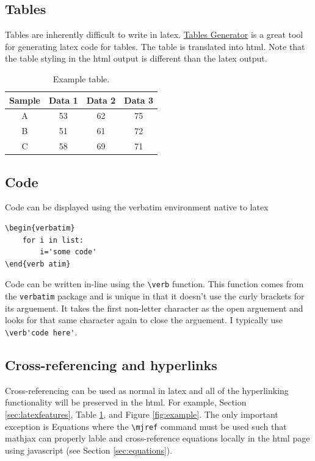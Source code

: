 \documentclass{article}
\begin{document}
\subsection{Tables}
Tables are inherently difficult to write in latex. \href{https://www.tablesgenerator.com/}{Tables Generator} is a great tool for generating latex code for tables. The table is translated into html. Note that the table styling in the html output is different than the latex output. 

\begin{table}[]
    \caption{Example table.}
    \label{table:example}
    \centering
    \begin{tabular}{|c|c|c|c|}
    \hline
    \multicolumn{1}{|l|}{Sample} & \multicolumn{1}{l|}{Data 1} & \multicolumn{1}{l|}{Data  2} & \multicolumn{1}{l|}{Data 3} \\ \hline
    A                            & 53                          & 62                           & 75                          \\ \hline
    B                            & 51                          & 61                           & 72                          \\ \hline
    C                            & 58                          & 69                           & 71                          \\ \hline
    \end{tabular}
    \end{table}

\subsection{Code}
Code can be displayed using the verbatim environment native to latex 
\begin{verbatim}
\begin{verbatim}
    for i in list:
        i='some code'
\end{verb atim} 
\end{verbatim}

Code can be written in-line using the \verb'\verb' function. This function comes from the \verb'verbatim' package and is unique in that it doesn't use the curly brackets for its arguement. It takes the first non-letter character as the open arguement and looks for that same character again to close the arguement. I typically use \verb_\verb'code here'_.   


\subsection{Cross-referencing and hyperlinks}
Cross-referencing can be used as normal in latex and all of the hyperlinking functionality will be preserved in the html. For example, Section \ref{sec:latexfeatures}, Table \ref{table:example}, and Figure \ref{fig:example}. The only important exception is Equations where the \verb'\mjref' command must be used such that mathjax can properly lable and cross-reference equations locally in the html page using javascript (see Section \ref{sec:equations}).
\end{document}
